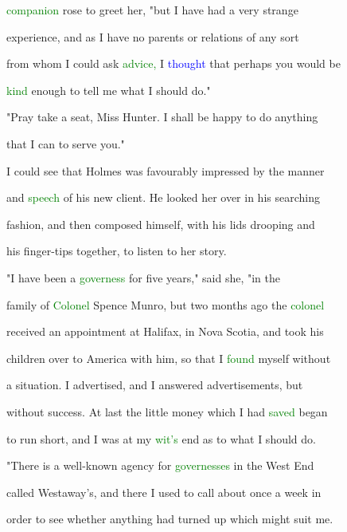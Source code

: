  \textcolor{green}{companion} rose to greet her, "but I have had a very strange

 experience, and as I have no parents or relations of any sort

 from whom I could ask \textcolor{green}{advice,} I \textcolor{blue}{thought} that perhaps you would be

 \textcolor{green}{kind} enough to tell me what I should do."



 \textcolor{BurntOrange}{"Pray} take a seat, Miss \textcolor{BurntOrange}{Hunter.} I shall be \textcolor{BurntOrange}{happy} to do anything

 that I can to \textcolor{BurntOrange}{serve} you."



 I could see that Holmes was favourably impressed by the manner

 and \textcolor{green}{speech} of his new client. He looked her over in his searching

 fashion, and then composed himself, with his lids drooping and

 his finger-tips together, to listen to her story.



 "I have been a \textcolor{green}{governess} for five years," said she, "in the

 family of \textcolor{green}{Colonel} Spence Munro, but two months ago the \textcolor{green}{colonel}

 received an appointment at Halifax, in Nova Scotia, and took his

 \textcolor{BurntOrange}{children} over to America with him, so that I \textcolor{green}{found} myself without

 a situation. I advertised, and I answered advertisements, but

 without \textcolor{BurntOrange}{success.} At last the little \textcolor{BurntOrange}{money} which I had \textcolor{green}{saved} began

 to run short, and I was at my \textcolor{green}{wit's} end as to what I should do.



 "There is a well-known agency for \textcolor{green}{governesses} in the West End

 called Westaway's, and there I used to call about once a week in

 order to see whether anything had turned up which might suit me.


